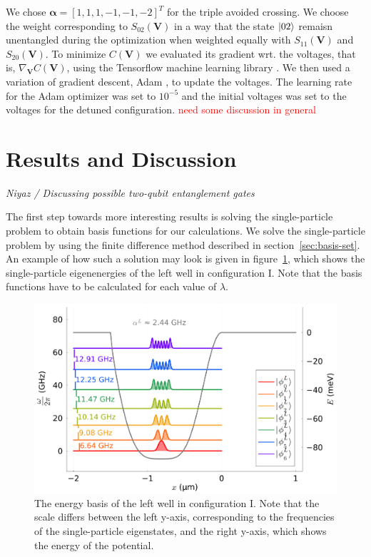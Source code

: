 \documentclass[twocolumn,superscriptaddress,unsortedaddress,
 amsmath,amssymb,
 aps,
]{revtex4-2}
\begin{document}
        We chose $\boldsymbol{\alpha} = [1,1,1,-1,-1,-2]^T$ for the triple avoided crossing. We choose the weight corresponding to $S_{02}(\boldsymbol{V})$ in a way that the state $\ket{02}$ remaisn unentangled during the optimization when weighted equally with $S_{11}(\boldsymbol{V})$ and $S_{20}(\boldsymbol{V})$. To minimize $C(\boldsymbol{V})$ we evaluated its gradient wrt. the voltages, that is,
        $\nabla_{\boldsymbol{V}}C(\boldsymbol{V})$, using the Tensorflow machine learning library \cite{tensorflow2015-whitepaper}. We then used a variation of gradient descent, Adam \cite{adamoptimizer}, to update the voltages. The learning rate for the Adam optimizer was set to $10^{-5}$ and the initial voltages was set to the voltages for the detuned configuration. \textcolor{red}{need some discussion in general}
        
        
\section{Results and Discussion}\label{sec:results} %

    \textit{Niyaz / Discussing possible two-qubit entanglement gates}

    The first step towards more interesting results is solving the single-particle problem to obtain basis functions for our calculations. We solve the single-particle problem by using the finite difference method described in section~\ref{sec:basis-set}. An example of how such a solution may look is given in figure~\ref{fig:left-basis}, which shows the single-particle eigenenergies of the left well in configuration I. Note that the basis functions have to be calculated for each value of $\lambda$.
    
     \begin{figure}
        \includegraphics[width=\columnwidth]{figures/figure3_L.pdf}
        \caption{\label{fig:left-basis}The energy basis of the left well in configuration I. %
        Note that the scale differs between the left y-axis, corresponding to the frequencies of the single-particle eigenstates, and the right y-axis, which shows the energy of the potential.
        }
    \end{figure}
\end{document}
